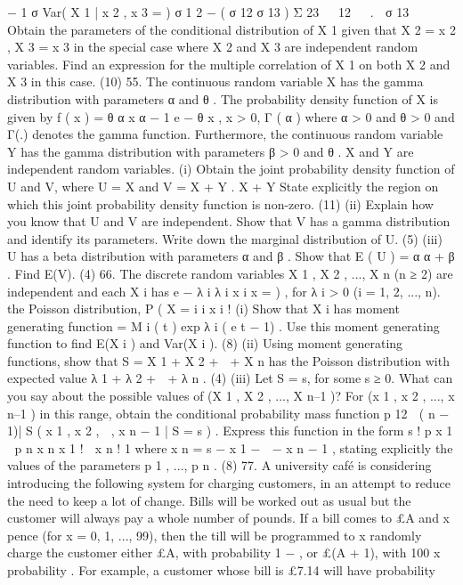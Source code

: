 − 1 σ
Var( X 1 | x 2 , x 3 =
) σ 1 2 − ( σ 12 σ 13 ) Σ 23   12   .
 σ 13 
Obtain the parameters of the conditional distribution of X 1 given that X 2 = x 2 ,
X 3 = x 3 in the special case where X 2 and X 3 are independent random variables.
Find an expression for the multiple correlation of X 1 on both X 2 and X 3 in this
case.
(10)
55.
The continuous random variable X has the gamma distribution with parameters
α and θ . The probability density function of X is given by
f ( x )
=
θ α x α − 1 e − θ x
, x > 0,
Γ ( α )
where α > 0 and θ > 0 and Γ(.) denotes the gamma function. Furthermore, the
continuous random variable Y has the gamma distribution with parameters β > 0
and θ . X and Y are independent random variables.
(i)
Obtain the joint probability density function of U and V, where
U =
X
and V = X + Y .
X + Y
State explicitly the region on which this joint probability density function is
non-zero.
(11)
(ii) Explain how you know that U and V are independent. Show that V has a
gamma distribution and identify its parameters. Write down the marginal
distribution of U.
(5)
(iii) U has a beta distribution with parameters α and β . Show that E ( U ) =
α
α + β
.
Find E(V).
(4)
66.
The discrete random variables X 1 , X 2 , ..., X n (n ≥ 2) are independent and each X i has
e − λ i λ i x i
x
=
)
, for λ i > 0 (i = 1, 2, ..., n).
the Poisson distribution, P ( X =
i
i
x i !
(i)
Show that X i has moment generating function
=
M i ( t ) exp{ λ i ( e t − 1)} .
Use this moment generating function to find E(X i ) and Var(X i ).
(8)
(ii)
Using moment generating functions, show that
S = X 1 + X 2 +  + X n
has the Poisson distribution with expected value λ 1 + λ 2 +  + λ n .
(4)
(iii)
Let S = s, for some s ≥ 0. What can you say about the possible values of
(X 1 , X 2 , ..., X n–1 )? For (x 1 , x 2 , ..., x n–1 ) in this range, obtain the conditional
probability mass function p 12  ( n − 1)| S ( x 1 , x 2 ,  , x n − 1 | S = s ) .
Express this function in the form
s !
p x 1  p n x n
x 1 !  x n ! 1
where x n = s − x 1 −  − x n − 1 , stating explicitly the values of the parameters
p 1 , ..., p n .
(8)
77.
A university café is considering introducing the following system for charging
customers, in an attempt to reduce the need to keep a lot of change. Bills will be
worked out as usual but the customer will always pay a whole number of pounds. If a
bill comes to £A and x pence (for x = 0, 1, ..., 99), then the till will be programmed to
x
randomly charge the customer either £A, with probability 1 −
, or £(A + 1), with
100
x
probability
. For example, a customer whose bill is £7.14 will have probability
